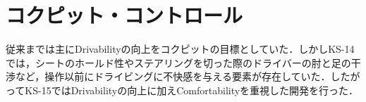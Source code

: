 \section{コクピット・コントロール}
従来までは主にDrivabilityの向上をコクピットの目標としていた．しかしKS-14では，シートのホールド性やステアリングを切った際のドライバーの肘と足の干渉など，操作以前にドライビングに不快感を与える要素が存在していた．したがってKS-15ではDrivabilityの向上に加えComfortabilityを重視した開発を行った．
